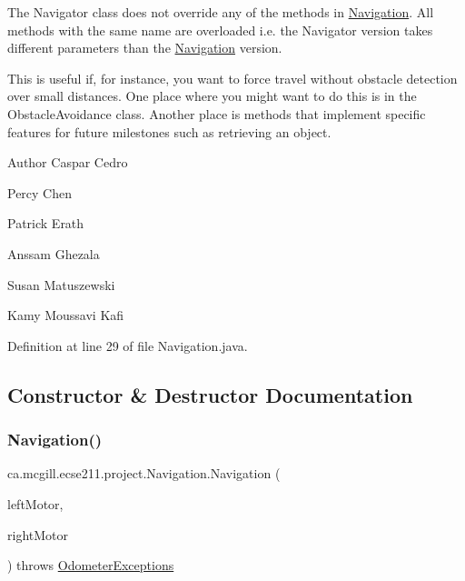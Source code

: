 The Navigator class does not override any of the methods in \hyperlink{classca_1_1mcgill_1_1ecse211_1_1project_1_1_navigation}{Navigation}. All methods with the same name are overloaded i.\+e. the Navigator version takes different parameters than the \hyperlink{classca_1_1mcgill_1_1ecse211_1_1project_1_1_navigation}{Navigation} version.

This is useful if, for instance, you want to force travel without obstacle detection over small distances. One place where you might want to do this is in the Obstacle\+Avoidance class. Another place is methods that implement specific features for future milestones such as retrieving an object.

\begin{DoxyAuthor}{Author}
Caspar Cedro 

Percy Chen 

Patrick Erath 

Anssam Ghezala 

Susan Matuszewski 

Kamy Moussavi Kafi 
\end{DoxyAuthor}


Definition at line 29 of file Navigation.\+java.



\subsection{Constructor \& Destructor Documentation}
\mbox{\label{classca_1_1mcgill_1_1ecse211_1_1project_1_1_navigation_aaee14b67c392ddd951e3ce21224c3e56}} 
\subsubsection{\texorpdfstring{Navigation()}{Navigation()}}
{\footnotesize\ttfamily ca.\+mcgill.\+ecse211.\+project.\+Navigation.\+Navigation (\begin{DoxyParamCaption}\item[{E\+V3\+Large\+Regulated\+Motor}]{left\+Motor,  }\item[{E\+V3\+Large\+Regulated\+Motor}]{right\+Motor }\end{DoxyParamCaption}) throws \hyperlink{classca_1_1mcgill_1_1ecse211_1_1odometer_1_1_odometer_exceptions}{Odometer\+Exceptions}}

